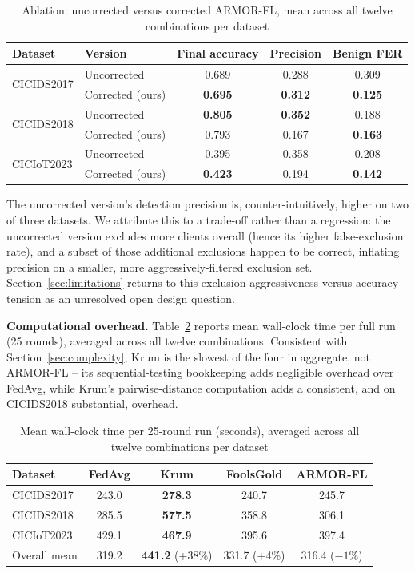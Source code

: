 \documentclass[pdflatex,iicol,sn-mathphys-num]{sn-jnl}%
\theoremstyle{thmstyleone}%
\theoremstyle{thmstyletwo}%
\theoremstyle{thmstylethree}%
\begin{document}
\begin{table}[htbp]
\centering
\caption{Ablation: uncorrected versus corrected ARMOR-FL, mean across all twelve combinations per dataset}\label{tab:ablation}
\footnotesize
\begin{tabular}{@{}llccc@{}}
\toprule
Dataset & Version & Final accuracy & Precision & Benign FER \\
\midrule
\multirow{2}{*}{CICIDS2017} & Uncorrected & 0.689 & 0.288 & 0.309 \\
 & Corrected (ours) & \textbf{0.695} & \textbf{0.312} & \textbf{0.125} \\
\midrule
\multirow{2}{*}{CICIDS2018} & Uncorrected & \textbf{0.805} & \textbf{0.352} & 0.188 \\
 & Corrected (ours) & 0.793 & 0.167 & \textbf{0.163} \\
\midrule
\multirow{2}{*}{CICIoT2023} & Uncorrected & 0.395 & 0.358 & 0.208 \\
 & Corrected (ours) & \textbf{0.423} & 0.194 & \textbf{0.142} \\
\bottomrule
\end{tabular}
\end{table}

The uncorrected version's detection precision is, counter-intuitively, higher on two of three datasets. We attribute this to a trade-off rather than a regression: the uncorrected version excludes more clients overall (hence its higher false-exclusion rate), and a subset of those additional exclusions happen to be correct, inflating precision on a smaller, more aggressively-filtered exclusion set. Section~\ref{sec:limitations} returns to this exclusion-aggressiveness-versus-accuracy tension as an unresolved open design question.

\textbf{Computational overhead.}\label{sec:overheadresults} Table~\ref{tab:overhead} reports mean wall-clock time per full run (25 rounds), averaged across all twelve combinations. Consistent with Section~\ref{sec:complexity}, Krum is the slowest of the four in aggregate, not ARMOR-FL -- its sequential-testing bookkeeping adds negligible overhead over FedAvg, while Krum's pairwise-distance computation adds a consistent, and on CICIDS2018 substantial, overhead.

\begin{table}[htbp]
\centering
\caption{Mean wall-clock time per 25-round run (seconds), averaged across all twelve combinations per dataset}\label{tab:overhead}
\footnotesize
\begin{tabular}{@{}lcccc@{}}
\toprule
Dataset & FedAvg & Krum & FoolsGold & ARMOR-FL \\
\midrule
CICIDS2017 & 243.0 & \textbf{278.3} & 240.7 & 245.7 \\
CICIDS2018 & 285.5 & \textbf{577.5} & 358.8 & 306.1 \\
CICIoT2023 & 429.1 & \textbf{467.9} & 395.6 & 397.4 \\
\midrule
Overall mean & 319.2 & \textbf{441.2} (+38\%) & 331.7 (+4\%) & 316.4 ($-1\%$) \\
\bottomrule
\end{tabular}
\end{table}
\end{document}
